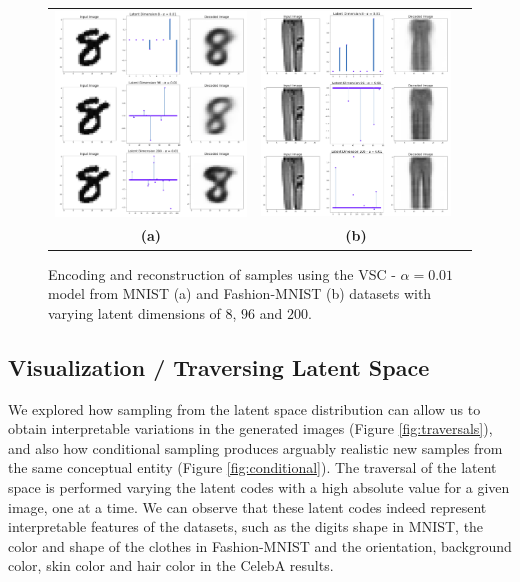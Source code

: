\begin{figure}[!h]
    \centering
    \begin{tabular}{ccc}
    \includegraphics[width=.45\textwidth]{figures/latent_mnist_example} &
    \includegraphics[width=.45\textwidth]{figures/latent_fashion_example} \\
    \textbf{(a)}  & \textbf{(b)}   \\[6pt]
\end{tabular}
    \centering
    \caption{Encoding and reconstruction of samples using the VSC - $\alpha = 0.01$ model from MNIST (a) and Fashion-MNIST (b) datasets with varying latent dimensions of $8$, $96$ and $200$. }
    \label{fig:latent_dim}
\end{figure}

\subsection{Visualization / Traversing Latent Space}
We explored how sampling from the latent space distribution can allow us to obtain interpretable variations in the generated images (Figure \ref{fig:traversals}), and also how conditional sampling produces arguably realistic new samples from the same conceptual entity (Figure \ref{fig:conditional}). The traversal of the latent space is performed varying the latent codes with a high absolute value for a given image, one at a time. We can observe that these latent codes indeed represent interpretable features of the datasets, such as the digits shape in MNIST, the color and shape of the clothes in Fashion-MNIST and the orientation, background color, skin color and hair color in the CelebA results.

